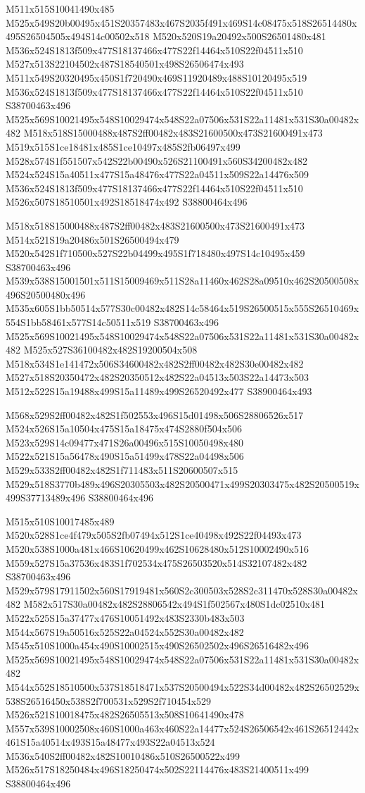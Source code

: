 \documentclass{article}
\begin{document}
\begin{multicols}{2}
M511x515S10041490x485 M525x549S20b00495x451S20357483x467S2035f491x469S14c08475x518S26514480x495S26504505x494S14c00502x518 M520x520S19a20492x500S26501480x481 M536x524S1813f509x477S18137466x477S22f14464x510S22f04511x510 M527x513S22104502x487S18540501x498S26506474x493 M511x549S20320495x450S1f720490x469S11920489x488S10120495x519 M536x524S1813f509x477S18137466x477S22f14464x510S22f04511x510 S38700463x496 M525x569S10021495x548S10029474x548S22a07506x531S22a11481x531S30a00482x482 M518x518S15000488x487S2ff00482x483S21600500x473S21600491x473 M519x515S1ce18481x485S1ce10497x485S2fb06497x499 M528x574S1f551507x542S22b00490x526S21100491x560S34200482x482 M524x524S15a40511x477S15a48476x477S22a04511x509S22a14476x509 M536x524S1813f509x477S18137466x477S22f14464x510S22f04511x510 M526x507S18510501x492S18518474x492 S38800464x496

M518x518S15000488x487S2ff00482x483S21600500x473S21600491x473 M514x521S19a20486x501S26500494x479 M520x542S1f710500x527S22b04499x495S1f718480x497S14c10495x459 S38700463x496 M539x538S15001501x511S15009469x511S28a11460x462S28a09510x462S20500508x496S20500480x496 M535x605S1bb50514x577S30c00482x482S14c58464x519S26500515x555S26510469x554S1bb58461x577S14c50511x519 S38700463x496 M525x569S10021495x548S10029474x548S22a07506x531S22a11481x531S30a00482x482 M525x527S36100482x482S19200504x508 M518x534S1e141472x506S34600482x482S2ff00482x482S30e00482x482 M527x518S20350472x482S20350512x482S22a04513x503S22a14473x503 M512x522S15a19488x499S15a11489x499S26520492x477 S38900464x493

M568x529S2ff00482x482S1f502553x496S15d01498x506S28806526x517 M524x526S15a10504x475S15a18475x474S2880f504x506 M523x529S14c09477x471S26a00496x515S10050498x480 M522x521S15a56478x490S15a51499x478S22a04498x506 M529x533S2ff00482x482S1f711483x511S20600507x515 M529x518S3770b489x496S20305503x482S20500471x499S20303475x482S20500519x499S37713489x496 S38800464x496

M515x510S10017485x489 M520x528S1ce4f479x505S2fb07494x512S1ce40498x492S22f04493x473 M520x538S1000a481x466S10620499x462S10628480x512S10002490x516 M559x527S15a37536x483S1f702534x475S26503520x514S32107482x482 S38700463x496 M529x579S17911502x560S17919481x560S2c300503x528S2c311470x528S30a00482x482 M582x517S30a00482x482S28806542x494S1f502567x480S1dc02510x481 M522x525S15a37477x476S10051492x483S2330b483x503 M544x567S19a50516x525S22a04524x552S30a00482x482 M545x510S1000a454x490S10002515x490S26502502x496S26516482x496 M525x569S10021495x548S10029474x548S22a07506x531S22a11481x531S30a00482x482 M544x552S18510500x537S18518471x537S20500494x522S34d00482x482S26502529x538S26516450x538S2f700531x529S2f710454x529 M526x521S10018475x482S26505513x508S10641490x478 M557x539S10002508x460S1000a463x460S22a14477x524S26506542x461S26512442x461S15a40514x493S15a48477x493S22a04513x524 M536x540S2ff00482x482S10010486x510S26500522x499 M526x517S18250484x496S18250474x502S22114476x483S21400511x499 S38800464x496


\end{multicols}
\end{document}

